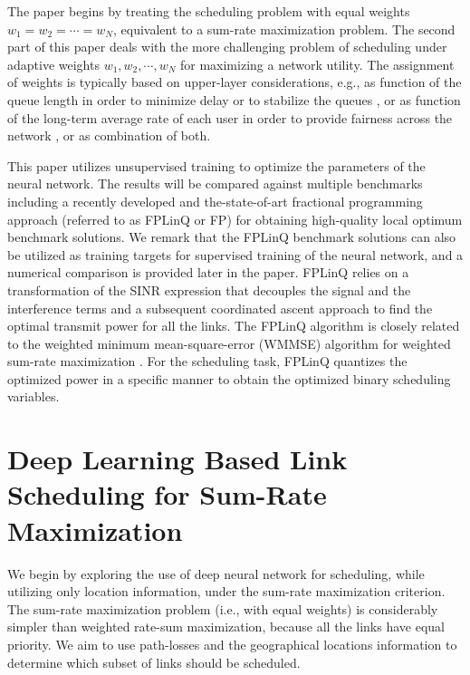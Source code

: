 \documentclass[journal,12pt,onecolumn,draftclsnofoot,]{IEEEtran}
\begin{document}
The paper begins by treating the scheduling problem with equal weights $w_1 = w_2 =
\cdots = w_N$, equivalent to a sum-rate maximization problem. The second part
of this paper deals with the more challenging problem of scheduling under
adaptive weights $w_1, w_2,\cdots,w_N$ for maximizing a network utility. The assignment of weights is typically based on upper-layer considerations, e.g., as function
of the queue length in order to minimize delay or to stabilize the queues
\cite{neely}, or as function of the long-term average rate of each user in
order to provide fairness across the network \cite{berry}, or as combination of both.

This paper utilizes unsupervised training to optimize the parameters of the
neural network. The results will be compared against multiple benchmarks
including a recently developed and the-state-of-art fractional programming 
approach (referred to as FPLinQ or FP) \cite{shen_ISIT17} for obtaining high-quality 
local optimum benchmark solutions. We remark that the FPLinQ benchmark
solutions can also be utilized as training targets for supervised training 
of the neural network, and 
a numerical comparison is provided later in the paper. FPLinQ relies on a transformation of the SINR expression
that decouples the signal and the interference terms and a subsequent
coordinated ascent approach to find the optimal transmit power for all the
links.  The FPLinQ algorithm is closely related to the weighted minimum
mean-square-error (WMMSE) algorithm for weighted sum-rate maximization
\cite{luo_TSP11}. For the scheduling task, FPLinQ quantizes the optimized power
in a specific manner to obtain the optimized binary scheduling variables.


\section{Deep Learning Based Link Scheduling for Sum-Rate Maximization}

We begin by exploring the use of deep neural network for scheduling, while
utilizing only location information, under the sum-rate maximization criterion.
The sum-rate maximization problem (i.e., with equal weights) is considerably
simpler than weighted rate-sum maximization, because all the links have equal
priority.  We aim to use path-losses and the geographical locations information 
to determine which subset of links should be scheduled.
\end{document}
